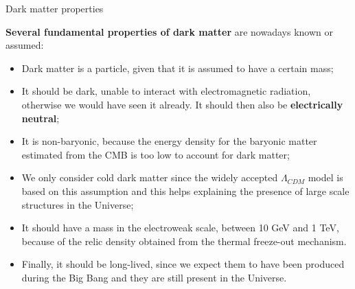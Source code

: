 \documentclass[8pt]{beamer}
\begin{document}
\begin{frame}{Dark matter properties}
\justifying

\textbf{Several fundamental properties of dark matter} are nowadays known or assumed:

\begin{itemize}
\justifying
\item Dark matter \alert{is a particle}, given that it is assumed to have a certain mass;
\item It should be \alert{dark}, unable to interact with electromagnetic radiation, otherwise we would have seen it already. It should then also be \textbf{electrically neutral};
\item It is \alert{non-baryonic}, because the energy density for the baryonic matter estimated from the CMB is too low to account for dark matter;
\item We only consider \alert{cold dark matter} since the widely accepted $\Lambda_{CDM}$ model is based on this assumption and this helps explaining the presence of large scale structures in the Universe;
\item It should \alert{have a mass in the electroweak scale}, between 10 GeV and 1 TeV, because of the relic density obtained from the thermal freeze-out mechanism.%
\item Finally, it should be \alert{long-lived}, since we expect them to have been produced during the Big Bang and they are still present in the Universe.
\end{itemize}

\end{frame}
\end{document}
